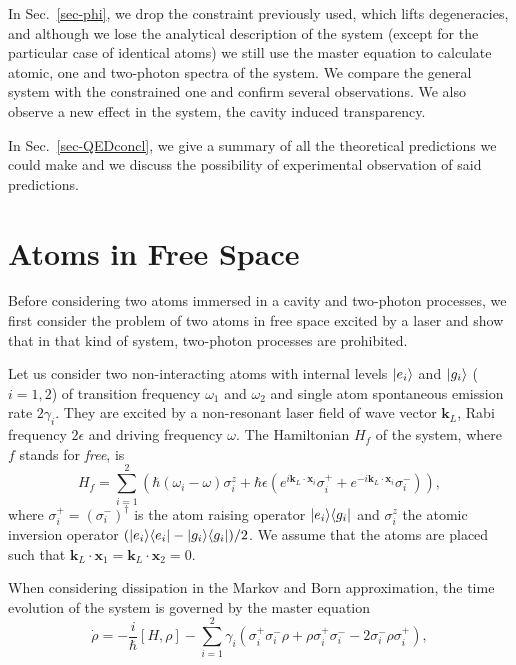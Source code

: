 In Sec.~\ref{sec-phi}, we drop the constraint previously used, which lifts degeneracies, and although we lose the analytical description of the system (except for the particular case of identical atoms) we still use the master equation to calculate  atomic, one and two-photon spectra of the system. We compare the general system with the constrained one and confirm several observations. We also observe a new effect in the system, the cavity induced transparency.

In Sec.~\ref{sec-QEDconcl}, we give a summary of all the theoretical predictions we could make and we discuss the possibility of experimental observation of said predictions.

\section{Atoms in Free Space} \label{sec-free}

Before considering two atoms immersed in a cavity and two-photon processes, we first consider the problem of two atoms in free space excited by a laser and show that in that kind of system, two-photon processes are prohibited.

Let us consider two non-interacting atoms with internal levels $| e_i \rangle$ and $| g_i \rangle$ ($i=1,2$) of transition frequency $\omega_1$ and $\omega_2$ and single atom spontaneous emission rate $2 \gamma_i$. They are excited by a non-resonant laser field of wave vector $\mathbf k_L$, Rabi frequency $2\epsilon$ and driving frequency $\omega$. The Hamiltonian $H_f$  of the system, where $f$ stands for \emph{free}, is
\[ H_f = \sum_{i=1}^2 \left( \hbar (\omega_i-\omega) \sigma^{z}_i +   \hbar \epsilon \left(e^{i \mathbf k_L \cdot \mathbf x_i} \sigma^+_i +e^{-i \mathbf k_L \cdot \mathbf x_i} \sigma^-_i    \right) \right), \]
where $\sigma_i^+ = (\sigma_i^-)^{\dagger}$ is the atom raising operator $| e_i \rangle \langle g_i |$ and $\sigma_i^z$ the atomic inversion operator $(| e_i \rangle \langle e_i |-| g_i \rangle \langle g_i |)/2$. We assume that the atoms are placed such that $\mathbf k_L \cdot \mathbf x_1 = \mathbf k_L \cdot \mathbf x_2 = 0$.

When considering dissipation in the Markov and Born approximation, the time evolution of the system is governed by the master equation
\begin{equation}
    \dot\rho = - \frac{i}{\hbar} [H,\rho] -  \sum_{i=1}^2 \gamma_i (\sigma_i^+ \sigma_i^- \rho +\rho \sigma_i^+ \sigma_i^- -2 \sigma_i^- \rho \sigma_i^+), \label{eq-MEFS}
\end{equation}

